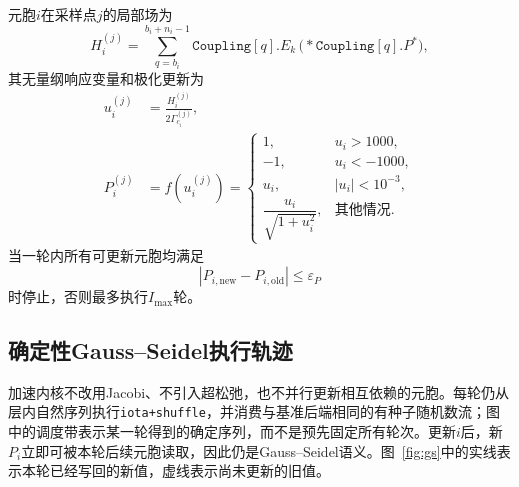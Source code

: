 \documentclass[UTF8,a4paper,11pt]{ctexart}
\begin{document}
元胞$i$在采样点$j$的局部场为
\begin{equation}
 H_i^{(j)}=\sum_{q=b_i}^{b_i+n_i-1}
   \texttt{Coupling}[q].E_k\,
   \bigl(*\texttt{Coupling}[q].P^\ast\bigr),
\end{equation}
其无量纲响应变量和极化更新为
\begin{align}
 u_i^{(j)}&=\frac{H_i^{(j)}}{2\Gamma_{c_i}^{(j)}},\\
 P_i^{(j)}&=f(u_i^{(j)})
  =\begin{cases}
  1,&u_i>1000,\\
 -1,&u_i<-1000,\\
  u_i,&|u_i|<10^{-3},\\
 \dfrac{u_i}{\sqrt{1+u_i^2}},&\text{其他情况}.
 \end{cases}
\end{align}
当一轮内所有可更新元胞均满足
\begin{equation}
 |P_{i,\mathrm{new}}-P_{i,\mathrm{old}}|\le\varepsilon_P
\end{equation}
时停止，否则最多执行$I_{\max}$轮。

\subsection{确定性Gauss--Seidel执行轨迹}

加速内核不改用Jacobi、不引入超松弛，也不并行更新相互依赖的元胞。每轮仍从层内自然序列执行\texttt{iota+shuffle}，并消费与基准后端相同的有种子随机数流；图中的调度带表示某一轮得到的确定序列，而不是预先固定所有轮次。更新$i$后，新$P_i$立即可被本轮后续元胞读取，因此仍是Gauss--Seidel语义。图~\ref{fig:gs}中的实线表示本轮已经写回的新值，虚线表示尚未更新的旧值。
\end{document}
